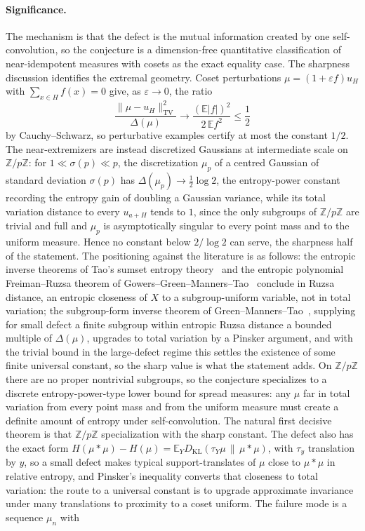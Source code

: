\documentclass[11pt]{article}
\theoremstyle{definition}
\newcommand{\E}{\mathbb E}
\newcommand{\Z}{\mathbb Z}
\providecommand{\Z}{\mathbb Z}
\providecommand{\E}{\mathbb E}
\begin{document}
\paragraph{Significance.}
The mechanism is that the defect is the mutual information created by
one self-convolution, so the conjecture is a dimension-free
quantitative classification of near-idempotent measures with cosets as
the exact equality case.  The sharpness discussion identifies the
extremal geometry.  Coset perturbations $\mu=(1+\varepsilon f)u_H$
with $\sum_{x\in H}f(x)=0$ give, as $\varepsilon\to0$, the ratio
\[
\frac{\|\mu-u_H\|_{\mathrm{TV}}^2}{\Delta(\mu)}
\longrightarrow
\frac{(\E|f|)^2}{2\,\E f^2}\le\frac12
\]
by Cauchy--Schwarz, so perturbative examples certify at most the
constant $1/2$.  The near-extremizers are instead discretized
Gaussians at intermediate scale on $\Z/p\Z$: for
$1\ll\sigma(p)\ll p$, the discretization $\mu_p$ of a centred Gaussian
of standard deviation $\sigma(p)$ has
$\Delta(\mu_p)\to\tfrac12\log2$, the entropy-power constant recording
the entropy gain of doubling a Gaussian variance, while its total
variation distance to every $u_{a+H}$ tends to $1$, since the only
subgroups of $\Z/p\Z$ are trivial and full and $\mu_p$ is
asymptotically singular to every point mass and to the uniform
measure.  Hence no constant below $2/\log2$ can serve, the sharpness half of the statement.  The positioning against the
literature is as follows: the entropic inverse theorems of Tao's sumset entropy theory~\cite{Tao10} and the entropic polynomial Freiman--Ruzsa theorem of Gowers--Green--Manners--Tao~\cite{GGMT25} conclude in Ruzsa distance, an entropic closeness of $X$ to a subgroup-uniform variable, not in total variation; the subgroup-form inverse theorem of Green--Manners--Tao~\cite{GMT23}, supplying for small defect a finite subgroup within entropic Ruzsa distance a bounded multiple of $\Delta(\mu)$, upgrades to total variation by a Pinsker argument, and with the trivial bound in the large-defect regime this settles the existence of some finite universal constant, so the sharp value is what the statement adds.  On
$\Z/p\Z$ there are no proper nontrivial subgroups, so the conjecture
specializes to a discrete entropy-power-type lower bound for spread
measures: any $\mu$ far in total variation from every point mass and
from the uniform measure must create a definite amount of entropy
under self-convolution.  The natural first decisive theorem is that $\Z/p\Z$ specialization with the sharp constant.  The defect also has the exact form $H(\mu*\mu)-H(\mu)=\E_Y D_{\mathrm{KL}}(\tau_Y\mu\,\|\,\mu*\mu)$, with $\tau_y$ translation by $y$, so a small defect makes typical support-translates of $\mu$ close to $\mu*\mu$ in relative entropy, and Pinsker's inequality converts that closeness to total variation: the route to a universal constant is to upgrade approximate invariance under many translations to proximity to a coset uniform.  The failure mode is a sequence $\mu_n$ with
\end{document}
